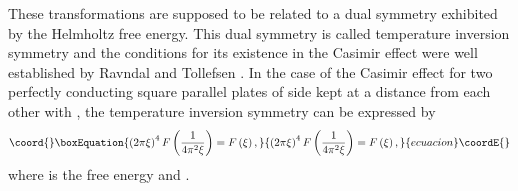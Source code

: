\documentclass[a4paper,12pt]{article}
\begin{document}
These transformations are supposed to be related to a dual symmetry exhibited by the Helmholtz free energy. This dual symmetry is called temperature inversion symmetry and the conditions for its existence in the Casimir effect were well established by Ravndal and Tollefsen \cite{Ravndal&Tollefsen89}. In the case of the Casimir effect for two perfectly conducting square parallel plates of side \coordHE{} kept at a distance \myHighlight{$\ell$}\coordHE{} from each other with \coordHE{} \cite{Casimir48}, the temperature inversion symmetry can be expressed by \cite{Brown&Maclay69}
%
\begin{equation}\coord{}\boxEquation{\label{TIS1}
\left(2\pi\xi\right)^4F\left(\frac{1}{4\pi^2\xi}\right)=F
\left(\xi\right),
}{\left(2\pi\xi\right)^4F\left(\frac{1}{4\pi^2\xi}\right)=F
\left(\xi\right),
}{ecuacion}\coordE{}\end{equation}  
%
where \coordHE{} is the free energy and \coordHE{}. 
\end{document}
